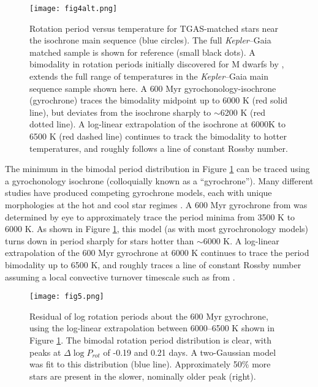 \documentclass[manuscript, letterpaper]{aastex6}
\newcommand{\Kepler}{\textsl{Kepler}\xspace}
\begin{document}
\begin{figure}[]
\centering
\texttt{[image: fig4alt.png]}
\caption{ Rotation period versus temperature for TGAS-matched stars near the isochrone main sequence (blue circles). 
The full \Kepler--Gaia matched sample is shown for reference (small black dots). A bimodality in rotation periods initially discovered for M dwarfs by \citet{mcquillan2013}, extends the full range of temperatures in the \Kepler--Gaia main sequence sample shown here.
A \citet{meibom2011} 600 Myr gyrochonology-isochrone (gyrochrone) traces the bimodality midpoint up to 6000 K (red solid line), but deviates from the isochrone sharply to $\sim$6200 K (red dotted line). A log-linear extrapolation of the isochrone at 6000K to 6500 K (red dashed line) continues to track the bimodality to hotter temperatures, and roughly follows a line of constant Rossby number. 
}
\label{fig:gyro}
\end{figure}



The minimum in the bimodal period distribution in Figure \ref{fig:gyro} can be traced using a gyrochonology isochrone (colloquially known as a ``gyrochrone'').  Many different studies have produced competing gyrochrone models, each with unique morphologies at the hot and cool star regimes \citep[e.g.][]{barnes2007,mamajek2008,meibom2011,angus2015}. A 600 Myr gyrochrone from \citet{meibom2011} was determined by eye to approximately trace the period minima from 3500 K to 6000 K. As shown in Figure \ref{fig:gyro}, this model (as with most gyrochronology models) turns down in period sharply for stars hotter than $\sim$6000 K. A log-linear extrapolation of the 600 Myr gyrochrone at 6000 K continues to trace the period bimodality up to 6500 K, and roughly traces a line of constant Rossby number assuming a local convective turnover timescale such as from \citet{barnes_kim2010}. 



\begin{figure}[]
\centering
\texttt{[image: fig5.png]}
\caption{Residual of log rotation periods about the \citet{meibom2011} 600 Myr gyrochrone, using the log-linear extrapolation between 6000--6500 K shown in Figure \ref{fig:gyro}. The bimodal rotation period distribution is clear, with peaks at $\Delta \log P_{rot}$ of -0.19 and 0.21 days. A two-Gaussian model was fit to this distribution (blue line).
Approximately 50\% more stars are present in the slower, nominally older peak (right).}
\label{fig:diff}
\end{figure}
\end{document}
